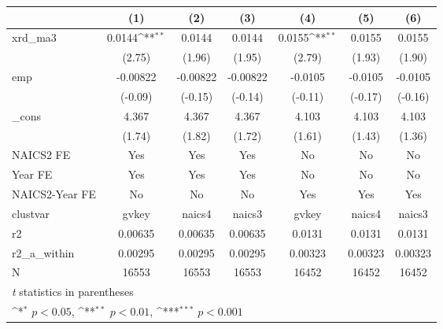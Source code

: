 {
\def\sym#1{\ifmmode^{#1}\else\(^{#1}\)\fi}
\begin{tabular}{l*{6}{c}}
\hline\hline
            &\multicolumn{1}{c}{(1)}         &\multicolumn{1}{c}{(2)}         &\multicolumn{1}{c}{(3)}         &\multicolumn{1}{c}{(4)}         &\multicolumn{1}{c}{(5)}         &\multicolumn{1}{c}{(6)}         \\
\hline
xrd\_ma3     &      0.0144\sym{**} &      0.0144         &      0.0144         &      0.0155\sym{**} &      0.0155         &      0.0155         \\
            &      (2.75)         &      (1.96)         &      (1.95)         &      (2.79)         &      (1.93)         &      (1.90)         \\
[1em]
emp         &    -0.00822         &    -0.00822         &    -0.00822         &     -0.0105         &     -0.0105         &     -0.0105         \\
            &     (-0.09)         &     (-0.15)         &     (-0.14)         &     (-0.11)         &     (-0.17)         &     (-0.16)         \\
[1em]
\_cons      &       4.367         &       4.367         &       4.367         &       4.103         &       4.103         &       4.103         \\
            &      (1.74)         &      (1.82)         &      (1.72)         &      (1.61)         &      (1.43)         &      (1.36)         \\
[1em]
NAICS2 FE   &         Yes         &         Yes         &         Yes         &          No         &          No         &          No         \\
[1em]
Year FE     &         Yes         &         Yes         &         Yes         &          No         &          No         &          No         \\
[1em]
NAICS2-Year FE&          No         &          No         &          No         &         Yes         &         Yes         &         Yes         \\
\hline
clustvar    &       gvkey         &      naics4         &      naics3         &       gvkey         &      naics4         &      naics3         \\
r2          &     0.00635         &     0.00635         &     0.00635         &      0.0131         &      0.0131         &      0.0131         \\
r2\_a\_within &     0.00295         &     0.00295         &     0.00295         &     0.00323         &     0.00323         &     0.00323         \\
N           &       16553         &       16553         &       16553         &       16452         &       16452         &       16452         \\
\hline\hline
\multicolumn{7}{l}{\footnotesize \textit{t} statistics in parentheses}\\
\multicolumn{7}{l}{\footnotesize \sym{*} \(p<0.05\), \sym{**} \(p<0.01\), \sym{***} \(p<0.001\)}\\
\end{tabular}
}
